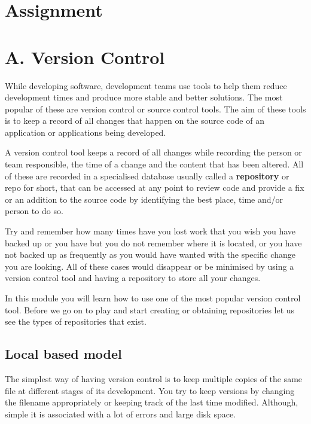 \documentclass[
]{book}
\theoremstyle{definition}
\theoremstyle{definition}
\theoremstyle{definition}
\theoremstyle{remark}
\begin{document}
\hypertarget{assignment}{%
\section*{Assignment}\label{assignment}}

\hypertarget{a.-version-control}{%
\section*{A. Version Control}\label{a.-version-control}}

While developing software, development teams use tools to help them reduce development times and produce more stable and better solutions.
The most popular of these are version control or source control tools. The aim of these tools is to keep a record of all changes that happen on the source code of an application or applications being developed.

A version control tool keeps a record of all changes while recording the person or team responsible, the time of a change and the content that has been altered. All of these are recorded in a specialised database usually called a \textbf{repository} or repo for short, that can be accessed at any point to review code and provide a fix or an addition to the source code by identifying the best place, time and/or person to do so.

Try and remember how many times have you lost work that you wish you have backed up or you have but you do not remember where it is located, or you have not backed up as frequently as you would have wanted with the specific change you are looking. All of these cases would disappear or be minimised by using a version control tool and having a repository to store all your changes.

In this module you will learn how to use one of the most popular version control tool. Before we go on to play and start creating or obtaining repositories let us see the types of repositories that exist.

\hypertarget{local-based-model}{%
\subsection*{Local based model}\label{local-based-model}}

The simplest way of having version control is to keep multiple copies of the same file at different stages of its development. You try to keep versions by changing the filename appropriately or keeping track of the last time modified. Although, simple it is associated with a lot of errors and large disk space.
\end{document}
